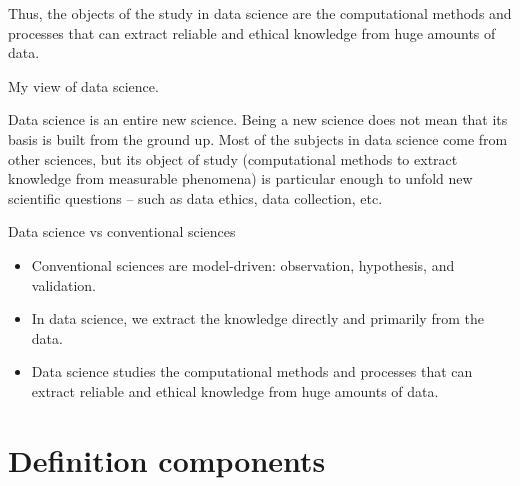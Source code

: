 Thus, the objects of the
study in data science are the computational methods and processes that can extract
reliable and ethical knowledge from huge amounts of data.

\def\verrids{(0,0) circle (20mm)}
\def\verrist{(-2.5,0) circle (15mm)}
\def\verride {(2.5,0) circle (15mm)}
\def\verrics {(0,-2.5) circle (15mm)}

\begin{figurebox}[label=fig:myview]{My view of data science.}
  \centering
  \tcblower
    Data science is an entire new science.  Being a new science
    does not mean that its basis is built from the ground up.  Most of the subjects in
    data science come from other sciences, but its object of study (computational methods
    to extract knowledge from measurable phenomena) is particular enough to unfold
    new scientific questions -- such as data ethics, data collection, etc.
\end{figurebox}

\begin{slidebox}{Data science vs conventional sciences}{}
  \begin{itemize}
    \item Conventional sciences are model-driven: observation, hypothesis, and validation.
    \item In data science, we extract the knowledge directly and primarily from the data.
    \item Data science studies the computational methods and processes that can extract
      reliable and ethical knowledge from huge amounts of data.
  \end{itemize}
\end{slidebox}

\section{Definition components}

